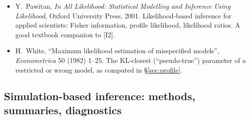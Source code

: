 \documentclass[11pt]{article}
\theoremstyle{definition}
\theoremstyle{remark}
\begin{document}
\begin{itemize}
\item[I9] Y.\ Pawitan, \emph{In All Likelihood: Statistical Modelling and Inference Using Likelihood}, Oxford University Press, 2001. Likelihood-based inference for applied scientists: Fisher information, profile likelihood, likelihood ratios. A good textbook companion to [I2].
\item[I10] H.\ White, ``Maximum likelihood estimation of misspecified models'', \emph{Econometrica} 50 (1982) 1--25. The KL-closest (``pseudo-true'') parameter of a restricted or wrong model, as computed in \S\ref{sec:profile}.
\end{itemize}

\subsection*{Simulation-based inference: methods, summaries, diagnostics}
\end{document}
